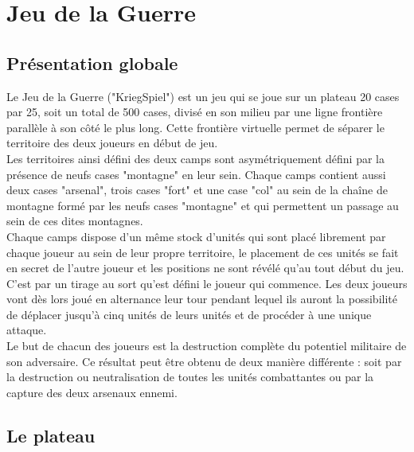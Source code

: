 \chapter{Jeu de la Guerre}

	
	\section{Présentation globale}
	
	Le Jeu de la Guerre ("KriegSpiel") est un jeu qui se joue sur un plateau 20 cases par 25, soit un total de 500 cases, divisé en son milieu par une ligne frontière parallèle à son côté le plus long. Cette frontière virtuelle permet de séparer le territoire des deux joueurs en début de jeu.
	\\
	
  Les territoires ainsi défini des deux camps sont asymétriquement défini par la présence de neufs cases "montagne" en leur sein. Chaque camps contient aussi deux cases "arsenal", trois cases "fort" et une case "col" au sein de la chaîne de montagne formé par les neufs cases "montagne" et qui permettent un passage au sein de ces dites montagnes.
  \\
  
  Chaque camps dispose d'un même stock d'unités qui sont placé librement par chaque joueur au sein de leur propre territoire, le placement de ces unités se fait en secret de l'autre joueur et les positions ne sont révélé qu'au tout début du jeu.
  \\
  
  C'est par un tirage au sort qu'est défini le joueur qui commence. Les deux joueurs vont dès lors joué en alternance leur tour pendant lequel ils auront la possibilité de déplacer jusqu'à cinq unités de leurs unités et de procéder à une unique attaque.
  \\
  
  Le but de chacun des joueurs est la destruction complète du potentiel militaire de son adversaire. Ce résultat peut être obtenu de deux manière différente : soit par la destruction ou neutralisation de toutes les unités combattantes ou par la capture des deux arsenaux ennemi. 
  
  
  
  \section{Le plateau}
  


